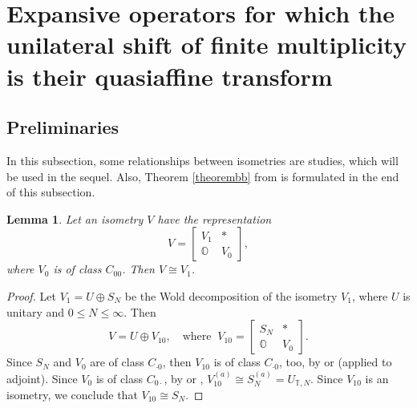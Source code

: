 \documentclass[a4paper,oneside,11pt]{amsart}
\numberwithin{equation}{section}
\theoremstyle{plain}
\newtheorem{lemma}[theorem]{Lemma}
\theoremstyle{definition}
\begin{document}
\section{Expansive operators for which the  unilateral shift of finite multiplicity is their quasiaffine transform}

\subsection{Preliminaries}

In this subsection, some relationships between isometries are studies, which will be used in the sequel. Also, Theorem \ref{theorembb} from \cite{hjelle} is formulated in the end of this subsection.

\begin{lemma}\label{lemvv} Let an isometry $V$ have the representation 
\begin{equation*} V=\left[\begin{matrix}V_1 & * \\ \mathbb O & V_0\end{matrix}\right],
\end{equation*}
where $V_0$ is of class $C_{00}$. Then $V\cong V_1$.
\end{lemma}

\begin{proof} Let $V_1=U\oplus S_N$ be the Wold decomposition of the isometry $V_1$, where $U$ is unitary and $0\leq N\leq\infty$. 
Then  \begin{equation*} V=U\oplus V_{10},\ \ \  \text{ where }\  V_{10}=\left[\begin{matrix}S_N & * \\ \mathbb O & V_0\end{matrix}\right].
\end{equation*}
Since $S_N$ and $V_0$ are of class $C_{\cdot 0}$, then $V_{10}$ is of class $C_{\cdot 0}$, too, by {\cite[Theorem 3]{ker89}} or {\cite[Theorem IX.1.6]{nfbk}}
(applied to adjoint). Since $V_0$ is of class $C_{0\cdot}$, by  {\cite[Theorem 3]{ker89}} or {\cite[Theorem IX.1.6]{nfbk}}, 
 $V_{10}^{(a)}\cong S_N^{(a)}=U_{\mathbb T, N}$. Since $V_{10}$ is an isometry, we conclude that $V_{10}\cong S_N$.
\end{proof}
\end{document}
